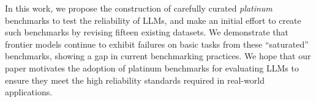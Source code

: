 In this work, we propose the construction of carefully curated \textit{platinum} benchmarks to test the reliability of LLMs, and make an initial effort to create such benchmarks by revising fifteen existing datasets. We demonstrate that frontier models continue to exhibit failures on basic tasks from these ``saturated'' benchmarks, showing a gap in current benchmarking practices. We hope that our paper motivates the adoption of platinum benchmarks for evaluating LLMs to ensure they meet the high reliability standards required in real-world applications. 

